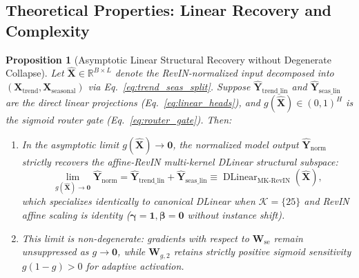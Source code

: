 \documentclass[pdflatex,sn-mathphys-num,referee,lineno]{sn-jnl}
\theoremstyle{thmstyleone}
\newtheorem{proposition}[theorem]{Proposition}
\theoremstyle{thmstyletwo}
\theoremstyle{thmstylethree}
\begin{document}
\subsection{Theoretical Properties: Linear Recovery and Complexity}\label{subsec:theory}

\begin{proposition}[Asymptotic Linear Structural Recovery without Degenerate Collapse]
\label{prop:linear_recovery}
Let $\hat{\mathbf{X}} \in \mathbb{R}^{B \times L}$ denote the RevIN-normalized input decomposed into $(\mathbf{X}_{\mathrm{trend}}, \mathbf{X}_{\mathrm{seasonal}})$ via Eq.~\eqref{eq:trend_seas_split}. Suppose $\hat{\mathbf{Y}}_{\mathrm{trend\_lin}}$ and $\hat{\mathbf{Y}}_{\mathrm{seas\_lin}}$ are the direct linear projections (Eq.~\eqref{eq:linear_heads}), and $g(\hat{\mathbf{X}}) \in (0, 1)^H$ is the sigmoid router gate (Eq.~\eqref{eq:router_gate}). Then:
\begin{enumerate}
    \item In the asymptotic limit $g(\hat{\mathbf{X}}) \to \mathbf{0}$, the normalized model output $\hat{\mathbf{Y}}_{\mathrm{norm}}$ strictly recovers the affine-RevIN multi-kernel DLinear structural subspace:
    \begin{equation}
    \lim_{g(\hat{\mathbf{X}}) \to \mathbf{0}} \hat{\mathbf{Y}}_{\mathrm{norm}} = \hat{\mathbf{Y}}_{\mathrm{trend\_lin}} + \hat{\mathbf{Y}}_{\mathrm{seas\_lin}} \equiv \operatorname{DLinear}_{\mathrm{MK\text{-}RevIN}}(\hat{\mathbf{X}}),
    \label{eq:prop1_claim}
    \end{equation}
    which specializes identically to canonical DLinear \cite{zeng2023dlinear} when $\mathcal{K} = \{25\}$ and RevIN affine scaling is identity ($\boldsymbol{\gamma}=\mathbf{1}, \boldsymbol{\beta}=\mathbf{0}$ without instance shift).
    \item This limit is non-degenerate: gradients with respect to $\mathbf{W}_{\mathrm{se}}$ remain unsuppressed as $g \to \mathbf{0}$, while $\mathbf{W}_{g,2}$ retains strictly positive sigmoid sensitivity $g(1-g) > 0$ for adaptive activation.
\end{enumerate}
\end{proposition}
\end{document}

